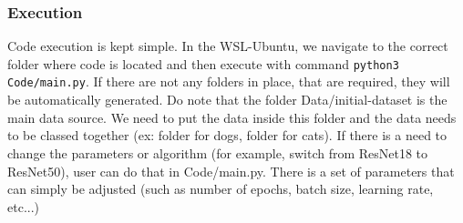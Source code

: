 \subsubsection{Execution}
Code execution is kept simple. In the WSL-Ubuntu, we navigate to the correct folder where code is located and then execute with command \verb|python3 Code/main.py|. If there are not any folders in place, that are required, they will be automatically generated. 
\newline
Do note that the folder Data/initial-dataset is the main data source. We need to put the data inside this folder and the data needs to be classed together (ex: folder for dogs, folder for cats).
\newline
If there is a need to change the parameters or algorithm (for example, switch from ResNet18 to ResNet50), user can do that in Code/main.py. There is a set of parameters that can simply be adjusted (such as number of epochs, batch size, learning rate, etc...)